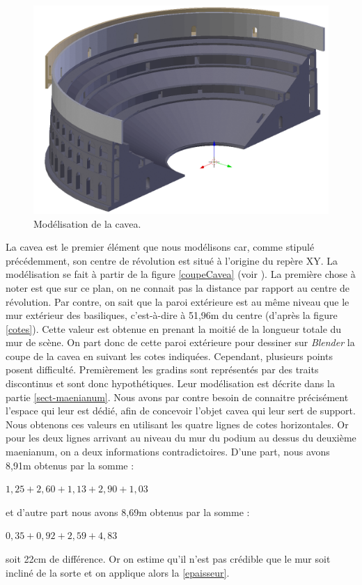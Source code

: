 \begin{figure}[!h]
\centering
	\includegraphics[width=\linewidth]{images/modCavea}
	\caption{Modélisation de la \gls{cavea}.} 
	\label{modCavea} 
\end{figure} 

La \gls{cavea} est le premier élément que nous modélisons car, comme stipulé précédemment, son centre de révolution est situé à l'origine du repère XY. La modélisation se fait à partir de la figure \ref{coupeCavea} (voir ). La première chose à noter est que sur ce plan, on ne connait pas la distance par rapport au centre de révolution. Par contre, on sait que la paroi extérieure est au même niveau que le mur extérieur des \glspl{basilique}, c'est-à-dire à 51,96m du centre (d'après la figure \ref{cotes}). Cette valeur est obtenue en prenant la moitié de la longueur totale du mur de scène. On part donc de cette paroi extérieure pour dessiner sur \textit{Blender} la coupe de la \gls{cavea} en suivant les cotes indiquées. Cependant, plusieurs points posent difficulté. Premièrement les gradins sont représentés par des traits discontinus et sont donc hypothétiques. Leur modélisation est décrite dans la partie \ref{sect-maenianum}. Nous avons par contre besoin de connaitre précisément l'espace qui leur est dédié, afin de concevoir l'objet  \gls{cavea} qui leur sert de support. Nous obtenons ces valeurs en utilisant les quatre lignes de cotes horizontales. Or pour les deux lignes arrivant au niveau du mur du  \gls{podium} au dessus du deuxième \gls{maenianum}, on a deux informations contradictoires. D'une part, nous avons 8,91m obtenus par la somme :
\begin{center}
$1,25+2,60+1,13+2,90+1,03$
\end{center}
et d'autre part nous avons 8,69m obtenus par la somme :
\begin{center}
$0,35+0,92+2,59+4,83$
\end{center}
soit 22cm de différence. Or on estime qu'il n'est pas crédible que le mur soit incliné de la sorte et on applique alors la \ref{epaisseur}. 

